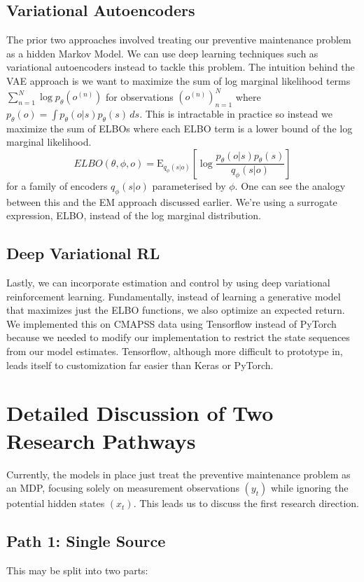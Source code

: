 \documentclass[english]{article}
\numberwithin{equation}{section}
\newcommand{\E}{\mathrm{E}}
\begin{document}
	\subsection*{Variational Autoencoders}
	The prior two approaches involved treating our preventive maintenance problem as a hidden Markov Model. We can use deep learning techniques such as variational autoencoders instead to tackle this problem. The intuition behind the VAE approach is we want to maximize the sum of log marginal likelihood terms $\sum_{n=1}^N \log p_{\theta}(o^{(n)})$ for observations $(o^{(n)})_{n=1}^N$ where $p_{\theta}(o)=\int p_{\theta}(o|s)p_{\theta}(s)\,ds.$ This is intractable in practice so instead we maximize the sum of ELBOs where each ELBO term is a lower bound of the log marginal likelihood.
	$$ELBO(\theta,\phi,o)=\E_{q_{\phi}(s|o)}[\log \frac{p_{\theta}(o|s)p_{\theta}(s)}{q_{\phi}(s|o)}]$$ for a family of encoders $q_{\phi}(s|o)$ parameterised by $\phi$. One can see the analogy between this and the EM approach discussed earlier. We're using a surrogate expression, ELBO, instead of the log marginal distribution.
	
	\subsection*{Deep Variational RL}
	Lastly, we can incorporate estimation and control by using deep variational reinforcement learning. Fundamentally, instead of learning a generative model that maximizes just the ELBO functions, we also optimize an expected return. We implemented this on CMAPSS data using Tensorflow instead of PyTorch because we needed to modify our implementation to restrict the state sequences from our model estimates. Tensorflow, although more difficult to prototype in, leads itself to customization far easier than Keras or PyTorch.
	 
	\section*{Detailed Discussion of Two Research Pathways}
	Currently, the models in place just treat the preventive maintenance problem as an MDP, focusing solely on measurement observations $(y_t)$ while ignoring the potential hidden states $(x_t)$. This leads us to discuss the first research direction.
	\subsection*{Path 1: Single Source}
	This may be split into two parts:
	
\end{document}
